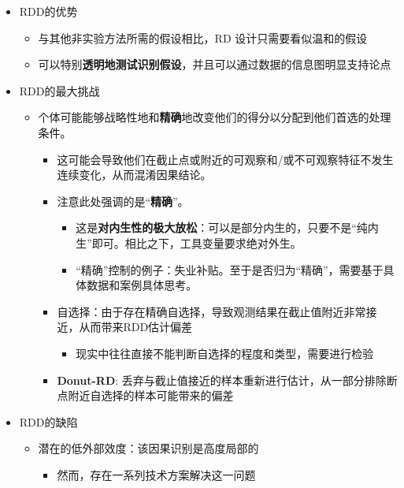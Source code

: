 \documentclass[11pt,a4paper]{ctexart}
\begin{document}
\begin{itemize}
\item
  RDD的优势

  \begin{itemize}
  \item
    与其他非实验方法所需的假设相比，RD 设计只需要看似温和的假设
  \end{itemize}

  \begin{itemize}
  \item
    可以特别\textbf{透明地测试识别假设}，并且可以通过数据的信息图明显支持论点
  \end{itemize}
\item
  RDD的最大挑战

  \begin{itemize}
  \item
    个体可能能够战略性地和\textbf{精确}地改变他们的得分以分配到他们首选的处理条件。

    \begin{itemize}
    \item
      这可能会导致他们在截止点或附近的可观察和/或不可观察特征不发生连续变化，从而混淆因果结论。
    \item
      注意此处强调的是``\textbf{精确}''。

      \begin{itemize}
      \item
        这是\textbf{对内生性的极大放松}：可以是部分内生的，只要不是``纯内生''即可。相比之下，工具变量要求绝对外生。
      \item
        ``精确''控制的例子：失业补贴。至于是否归为``精确''，需要基于具体数据和案例具体思考。
      \end{itemize}
    \item
      自选择：由于存在精确自选择，导致观测结果在截止值附近非常接近，从而带来RDD估计偏差

      \begin{itemize}
      \item
        现实中往往直接不能判断自选择的程度和类型，需要进行检验
      \end{itemize}
    \item
      \textbf{Donut-RD}:
      丢弃与截止值接近的样本重新进行估计，从一部分排除断点附近自选择的样本可能带来的偏差
    \end{itemize}
  \end{itemize}
\end{itemize}

\begin{itemize}
\item
  RDD的缺陷

  \begin{itemize}
  \item
    潜在的低外部效度：该因果识别是高度局部的

    \begin{itemize}
    \item
      然而，存在一系列技术方案解决这一问题
    \end{itemize}
  \end{itemize}
\end{itemize}
\end{document}
